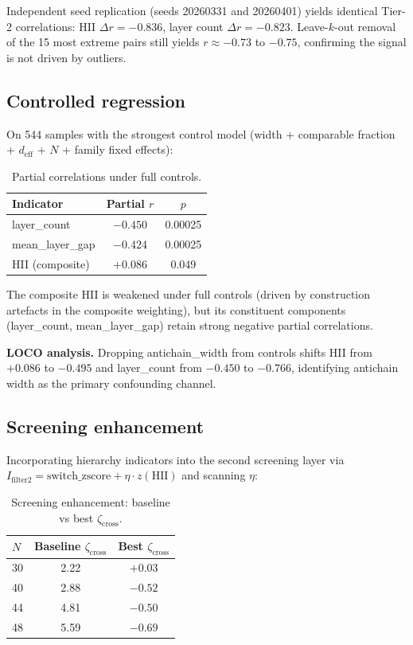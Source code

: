 \documentclass[12pt,a4paper]{article}
\begin{document}
Independent seed replication (seeds 20260331 and 20260401) yields identical
Tier-2 correlations: HII $\Delta r = -0.836$, layer count $\Delta r = -0.823$.
Leave-$k$-out removal of the 15 most extreme pairs still yields $r\approx -0.73$
to $-0.75$, confirming the signal is not driven by outliers.

\subsection{Controlled regression}

On 544 samples with the strongest control model
(width + comparable fraction + $d_{\mathrm{eff}}$ + $N$ + family fixed effects):

\begin{table}[h]
\centering
\caption{Partial correlations under full controls.}
\label{tab:c_regression}
\begin{tabular}{lcc}
\toprule
Indicator & Partial $r$ & $p$ \\
\midrule
layer\_count     & $-0.450$ & 0.00025 \\
mean\_layer\_gap & $-0.424$ & 0.00025 \\
HII (composite)  & $+0.086$ & 0.049 \\
\bottomrule
\end{tabular}
\end{table}

The composite HII is weakened under full controls (driven by construction
artefacts in the composite weighting), but its constituent components
(layer\_count, mean\_layer\_gap) retain strong negative partial correlations.

\textbf{LOCO analysis.}
Dropping antichain\_width from controls shifts HII from $+0.086$ to $-0.495$
and layer\_count from $-0.450$ to $-0.766$, identifying antichain width as the
primary confounding channel.

\subsection{Screening enhancement}

Incorporating hierarchy indicators into the second screening layer via
$I_{\mathrm{filter2}} = \text{switch\_zscore} + \eta\cdot z(\text{HII})$
and scanning $\eta$:

\begin{table}[h]
\centering
\caption{Screening enhancement: baseline vs best $\zeta_{\mathrm{cross}}$.}
\label{tab:c_enhance}
\begin{tabular}{lcc}
\toprule
$N$ & Baseline $\zeta_{\mathrm{cross}}$ & Best $\zeta_{\mathrm{cross}}$ \\
\midrule
30 & 2.22 & $+0.03$ \\
40 & 2.88 & $-0.52$ \\
44 & 4.81 & $-0.50$ \\
48 & 5.59 & $-0.69$ \\
\bottomrule
\end{tabular}
\end{table}
\end{document}
